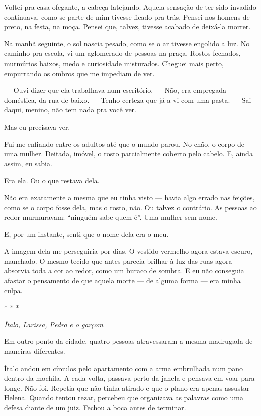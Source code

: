 \medskip

Voltei pra casa ofegante, a cabeça latejando.  
Aquela sensação de ter sido invadido continuava, como se parte de mim tivesse ficado pra trás.  
Pensei nos homens de preto, na festa, na moça.  
Pensei que, talvez, tivesse acabado de deixá-la morrer.

\medskip

Na manhã seguinte, o sol nascia pesado, como se o ar tivesse engolido a luz.  
No caminho pra escola, vi um aglomerado de pessoas na praça.  
Rostos fechados, murmúrios baixos, medo e curiosidade misturados.  
Cheguei mais perto, empurrando os ombros que me impediam de ver.

— Ouvi dizer que ela trabalhava num escritório.  
— Não, era empregada doméstica, da rua de baixo.  
— Tenho certeza que já a vi com uma pasta.  
— Sai daqui, menino, não tem nada pra você ver.  

Mas eu precisava ver.

Fui me enfiando entre os adultos até que o mundo parou.  
No chão, o corpo de uma mulher.  
Deitada, imóvel, o rosto parcialmente coberto pelo cabelo.  
E, ainda assim, eu sabia.

Era ela.  
Ou o que restava dela.

Não era exatamente a mesma que eu tinha visto — havia algo errado nas feições, como se o corpo fosse dela, mas o rosto, não.  
Ou talvez o contrário.  
As pessoas ao redor murmuravam: “ninguém sabe quem é”.  
Uma mulher sem nome.  

E, por um instante, senti que o nome dela era o meu.

A imagem dela me perseguiria por dias.  
O vestido vermelho agora estava escuro, manchado.  
O mesmo tecido que antes parecia brilhar à luz das ruas agora absorvia toda a cor ao redor, como um buraco de sombra.  
E eu não conseguia afastar o pensamento de que aquela morte — de alguma forma — era minha culpa.

\begin{center}
* * *
\end{center}

\begin{center}
\textit{Ítalo, Larissa, Pedro e o garçom}
\end{center}

Em outro ponto da cidade, quatro pessoas atravessaram a mesma madrugada de maneiras diferentes.

Ítalo andou em círculos pelo apartamento com a arma embrulhada num pano dentro da mochila. A cada volta, passava perto da janela e pensava em voar para longe. Não foi. Repetia que não tinha atirado e que o plano era apenas assustar Helena. Quando tentou rezar, percebeu que organizava as palavras como uma defesa diante de um juiz. Fechou a boca antes de terminar.

